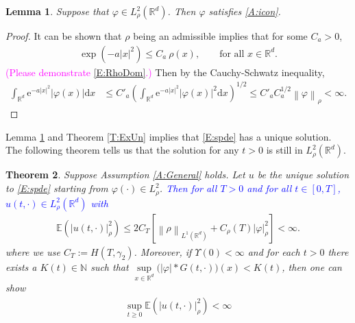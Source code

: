 \documentclass[a4paper,11pt]{article}
\numberwithin{equation}{section}
\theoremstyle{plain}
\newtheorem{theorem}{Theorem}[section]
\newtheorem{lemma}[theorem]{Lemma}
\theoremstyle{definition}
\newcommand{\R}{\mathbb{R}}
\newcommand{\E}{\mathbb{E}}
\newcommand{\e}{\mathrm{e}}
\newcommand{\Norm}[1]{\left\|  #1   \right\|}
\newcommand{\ud}{\ensuremath{\mathrm{d}}}
\begin{document}
\begin{lemma}
	\label{L:phi}
	Suppose that $\varphi \in L^2_\rho(\R^d)$. Then $\varphi$ satisfies \eqref{A:icon}.
\end{lemma}

\begin{proof} 
	It can be shown that $\rho$ being an admissible implies that for some $C_a>0$,
	\begin{align}
		\label{E:RhoDom}
		\exp\left(-a|x|^2\right)\le C_a\: \rho(x),\qquad \text{for all $x\in\R^d$.}
	\end{align}
	\textcolor{magenta}{(Please demonstrate \eqref{E:RhoDom}.)} 
	Then by the Cauchy-Schwatz inequality, 
	\begin{align*}
		\int_{\R^d} \e^{-a|x|^2} |\varphi(x)|\ud x
		&\le C'_a \left(\int_{\R^d} \e^{-a|x|^2} |\varphi(x)|^2\ud x\right)^{1/2}
		\le C'_a C_a^{1/2} \Norm{\varphi}_\rho<\infty.
	\end{align*}
\end{proof}

Lemma \ref{L:phi} and Theorem \ref{T:ExUn} implies that \eqref{E:spde} has a unique solution. 
The following theorem tells us that the solution for any $t>0$ is still in $L_\rho^2(\R^d)$.

\begin{theorem} 
	\label{T:Moment}
	Suppose Assumption \ref{A:General} holds. 
	Let $u$ be the unique solution to \eqref{E:spde} starting from  $\varphi(\cdot) \in L^2_\rho$.
	\textcolor{blue}{Then for all $T>0$ and for all $t \in [0,T]$, $u(t,\cdot)\in L^2_\rho(\R^d)$ with} 
	\begin{align}
		\label{E:uNormRho}
		\E\left(| u(t,\cdot)|_\rho^2\right) 
		\le  2 C_T \left[ \Norm{\rho}_{L^1(\R^d)} + C_\rho(T) |\varphi|_{\rho}^2 \right]<\infty.
	\end{align}
	where we use $C_T:= H(T,\gamma_2)$. Moreover, if $\Upsilon(0)<\infty$ and 
	 for each $t>0$ there exists a $K(t) \in \mathbb N$ such that $\sup\limits_{x\in \R^d}\big(|\varphi|*G(t,\cdot)\big)(x) < K(t)$, then one can show
	\begin{align*}
		\sup_{t\ge 0}\E\left(|u(t,\cdot)|_\rho^2\right) < \infty  
	\end{align*}
\end{theorem}
\end{document}
